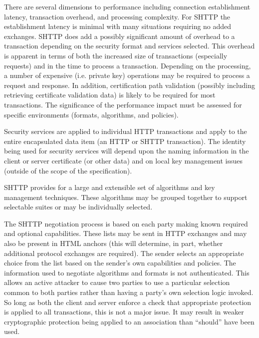   There are several dimensions to performance including connection
  establishment latency, transaction overhead, and processing complexity.
  For SHTTP the establishment latency is minimal with many situations
  requiring no added exchanges. SHTTP does add a possibly significant
  amount of overhead to a transaction depending on the security format and
  services selected. This overhead is apparent in terms of both the
  increased size of transactions (especially requests) and in the time to
  process a transaction. Depending on the processing, a number of expensive
  (i.e. private key) operations may be required to process a request and
  response. In addition, certification path validation (possibly including
  retrieving certificate validation data) is likely to be required for most
  transactions. The significance of the performance impact must be assessed
  for specific environments (formats, algorithms, and policies).

  
  Security services are applied to individual HTTP transactions and apply
  to the entire encapsulated data item (an HTTP or SHTTP transaction).  The
  identity being used for security services will depend upon the naming
  information in the client or server certificate (or other data) and on
  local key management issues (outside of the scope of the specification).

  
  SHTTP provides for a large and extensible set of algorithms and key
  management techniques. These algorithms may be grouped together to
  support selectable suites or may be individually selected.

  
  The SHTTP negotiation process is based on each party making known
  required and optional capabilities. These lists may be sent in HTTP
  exchanges and may also be present in HTML anchors (this will determine,
  in part, whether additional protocol exchanges are required). The sender
  selects an appropriate choice from the list based on the sender's own
  capabilities and policies. The information used to negotiate algorithms
  and formats is not authenticated. This allows an active attacker to cause
  two parties to use a particular selection common to both parties rather
  than having a party's own selection logic invoked. So long as both the
  client and server enforce a check that appropriate protection is applied
  to all transactions, this is not a major issue. It may result in weaker
  cryptographic protection being applied to an association than ``should''
  have been used.\\
  
